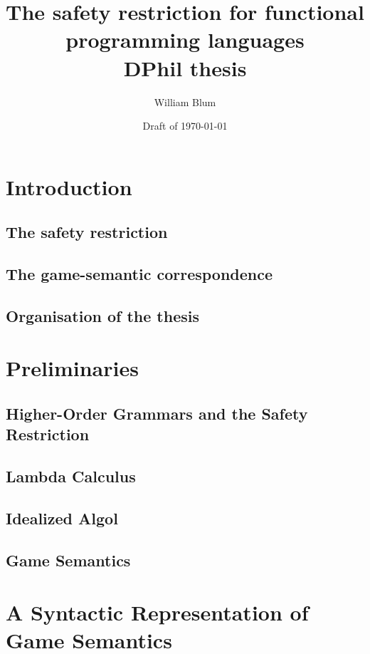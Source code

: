 


\author{William Blum}
\title{The safety restriction for functional programming languages\\{\small DPhil thesis}}
\date{Draft of \today}


\maketitle \tableofcontents


\chapter{Introduction}
    \section{The safety restriction}
    \section{The game-semantic correspondence}
    \section{Organisation of the thesis}

\chapter{Preliminaries}
    \section{Higher-Order Grammars and the Safety Restriction}
    \section{Lambda Calculus}
    \section{Idealized Algol}
    \section{Game Semantics}

\chapter{A Syntactic Representation of Game Semantics}
